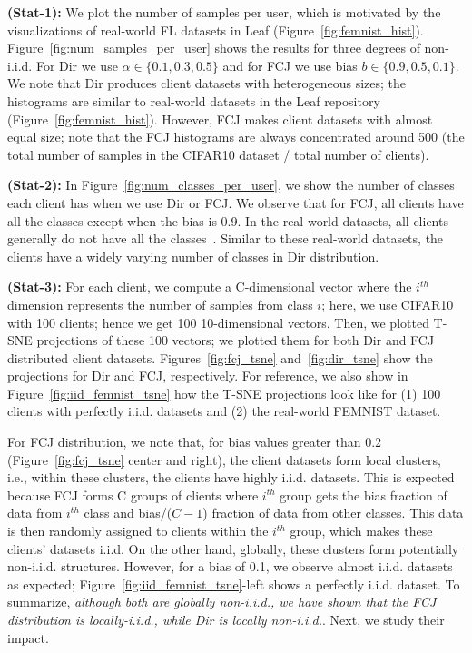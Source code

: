 \noindent \textbf{(Stat-1):} We plot the number of samples per user, which is motivated by the visualizations of real-world FL datasets in Leaf (Figure~\ref{fig:femnist_hist}).
Figure~\ref{fig:num_samples_per_user} shows the results for three degrees of non-i.i.d. For Dir we use $\alpha\in\{0.1, 0.3, 0.5\}$ and for FCJ we use bias $b\in\{0.9, 0.5, 0.1\}$.
We note that Dir produces client datasets with heterogeneous sizes; the histograms are similar to real-world datasets in the Leaf repository (Figure~\ref{fig:femnist_hist}). However, FCJ makes client datasets with almost equal size; note that the FCJ histograms are always concentrated around 500 (the total number of samples in the CIFAR10 dataset / total number of clients).

\noindent \textbf{(Stat-2):} In Figure~\ref{fig:num_classes_per_user}, we show the number of classes each client has when we use Dir or FCJ. We observe that for FCJ, all clients have all the classes except when the bias is 0.9. In the real-world datasets, all clients generally do not have all the classes~\cite{mcmahan2017communication}. Similar to these real-world datasets, the clients have a widely varying number of classes in Dir distribution.

\noindent\textbf{(Stat-3):} For each client, we compute a C-dimensional vector where the $i^{th}$ dimension represents the number of samples from class $i$; here, we use CIFAR10 with 100 clients; hence we get 100 10-dimensional vectors. Then, we plotted T-SNE projections of these 100 vectors; we plotted them for both Dir and FCJ distributed client datasets. Figures~\ref{fig:fcj_tsne} and~\ref{fig:dir_tsne} show the projections for Dir and FCJ, respectively. 
For reference, we also show in Figure~\ref{fig:iid_femnist_tsne} how the T-SNE projections look like for (1) 100 clients with perfectly i.i.d. datasets and (2) the real-world FEMNIST dataset.

For FCJ distribution, we note that, for bias values greater than 0.2 (Figure~\ref{fig:fcj_tsne} center and right), the client datasets form local clusters, i.e., within these clusters, the clients have highly i.i.d. datasets. This is expected because FCJ forms C groups of clients where $i^{th}$ group gets the bias fraction of data from $i^{th}$ class and bias/($C-1$) fraction of data from other classes. This data is then randomly assigned to clients within the $i^{th}$ group, which makes these clients' datasets i.i.d. On the other hand, globally,  
these clusters form potentially non-i.i.d. structures. However, for a bias of 0.1, we observe almost i.i.d. datasets as expected; Figure~\ref{fig:iid_femnist_tsne}-left shows a perfectly i.i.d. dataset. To summarize, \emph{although both are globally non-i.i.d., we have shown that the FCJ distribution is locally-i.i.d., while Dir is locally non-i.i.d.}. Next, we study their impact.
